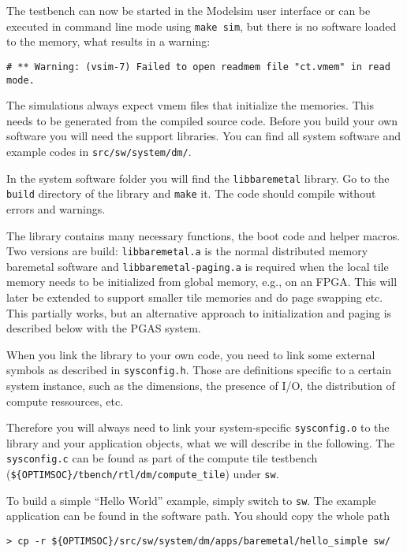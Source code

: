 \medskip
The testbench can now be started in the Modelsim user interface or can
be executed in command line mode using \verb|make sim|, but there is
no software loaded to the memory, what results in a warning:

\begin{verbatim}
# ** Warning: (vsim-7) Failed to open readmem file "ct.vmem" in read mode.
\end{verbatim}

The simulations always expect vmem files that initialize the memories.
This needs to be generated from the compiled source code. Before you
build your own software you will need the support libraries. You can
find all system software and example codes in
\verb|src/sw/system/dm/|.

In the system software folder you will find the \verb|libbaremetal|
library. Go to the \verb|build| directory of the library and
\verb|make| it. The code should compile without errors and warnings.

The library contains many necessary functions, the boot code and
helper macros. Two versions are build: \verb|libbaremetal.a| is the
normal distributed memory baremetal software and
\verb|libbaremetal-paging.a| is required when the local tile memory
needs to be initialized from global memory, e.g., on an FPGA. This
will later be extended to support smaller tile memories and do page
swapping etc. This partially works, but an alternative approach to
initialization and paging is described below with the PGAS system.

When you link the library to your own code, you need to link some
external symbols as described in \verb|sysconfig.h|. Those are
definitions specific to a certain system instance, such as the
dimensions, the presence of I/O, the distribution of compute
ressources, etc.

Therefore you will always need to link your system-specific
\verb|sysconfig.o| to the library and your application objects, what
we will describe in the following. The \verb|sysconfig.c| can be found
as part of the compute tile testbench
(\verb|${OPTIMSOC}/tbench/rtl/dm/compute_tile|) under \verb|sw|.

To build a simple ``Hello World'' example, simply switch to \verb|sw|.
The example application can be found in the software path. You should
copy the whole path

\begin{verbatim}
> cp -r ${OPTIMSOC}/src/sw/system/dm/apps/baremetal/hello_simple sw/
\end{verbatim}

